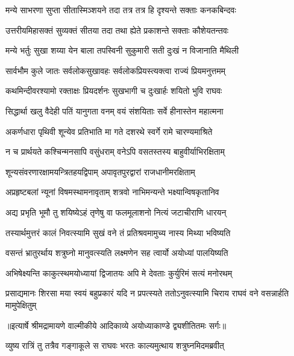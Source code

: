 \twolineshloka
{मन्ये साभरणा सुप्ता सीतास्मिञ्शयने तदा}
{तत्र तत्र हि दृश्यन्ते सक्ताः कनकबिन्दवः} %

\twolineshloka
{उत्तरीयमिहासक्तं सुव्यक्तं सीतया तदा}
{तथा ह्येते प्रकाशन्ते सक्ताः कौशेयतन्तवः} %

\twolineshloka
{मन्ये भर्तुः सुखा शय्या येन बाला तपस्विनी}
{सुकुमारी सती दुःखं न विजानाति मैथिली} %

\twolineshloka
{सार्वभौम कुले जातः सर्वलोकसुखावहः}
{सर्वलोकप्रियस्त्यक्त्वा राज्यं प्रियमनुत्तमम्} %

\twolineshloka
{कथमिन्दीवरश्यामो रक्ताक्षः प्रियदर्शनः}
{सुखभागी च दुःखार्हः शयितो भुवि राघवः} %

\twolineshloka
{सिद्धार्था खलु वैदेही पतिं यानुगता वनम्}
{वयं संशयिताः सर्वे हीनास्तेन महात्मना} %

\twolineshloka
{अकर्णधारा पृथिवी शून्येव प्रतिभाति मा}
{गते दशरथे स्वर्गे रामे चारण्यमाश्रिते} %

\twolineshloka
{न च प्रार्थयते कश्चिन्मनसापि वसुंधराम्}
{वनेऽपि वसतस्तस्य बाहुवीर्याभिरक्षिताम्} %

\twolineshloka
{शून्यसंवरणारक्षामयन्त्रितहयद्विपाम्}
{अपावृतपुरद्वारां राजधानीमरक्षिताम्} %

\twolineshloka
{अप्रहृष्टबलां न्यूनां विषमस्थामनावृताम्}
{शत्रवो नाभिमन्यन्ते भक्ष्यान्विषकृतानिव} %

\twolineshloka
{अद्य प्रभृति भूमौ तु शयिष्येऽहं तृणेषु वा}
{फलमूलाशनो नित्यं जटाचीराणि धारयन्} %

\twolineshloka
{तस्यार्थमुत्तरं कालं निवत्स्यामि सुखं वने}
{तं प्रतिश्रवमामुच्य नास्य मिथ्या भविष्यति} %

\twolineshloka
{वसन्तं भ्रातुरर्थाय शत्रुघ्नो मानुवत्स्यति}
{लक्ष्मणेन सह त्वार्यो अयोध्यां पालयिष्यति} %

\twolineshloka
{अभिषेक्ष्यन्ति काकुत्स्थमयोध्यायां द्विजातयः}
{अपि मे देवताः कुर्युरिमं सत्यं मनोरथम्} %

\fourlineindentedshloka
{प्रसाद्यमानः शिरसा मया स्वयं}
{ बहुप्रकारं यदि न प्रपत्स्यते}
{ततोऽनुवत्स्यामि चिराय राघवं}
{ वने वसन्नार्हति मामुपेक्षितुम्} %


{॥इत्यार्षे श्रीमद्रामायणे वाल्मीकीये आदिकाव्ये अयोध्याकाण्डे द्व्यशीतितमः सर्गः॥}


\twolineshloka
{व्युष्य रात्रिं तु तत्रैव गङ्गाकूले स राघवः}
{भरतः काल्यमुत्थाय शत्रुघ्नमिदमब्रवीत्} %

